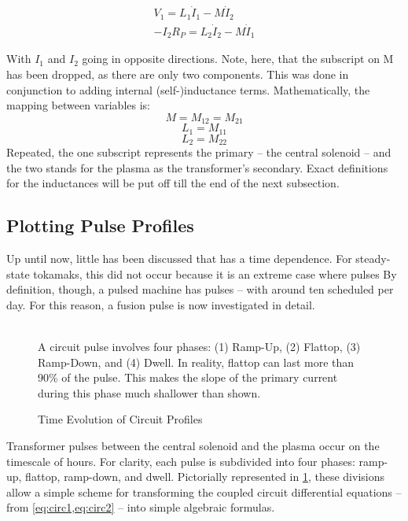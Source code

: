 \begin{align}
	\label{eq:circ1}
	V_1 = L_1 \dot I_1 - M \dot I_2 \\
	\label{eq:circ2}
	-I_2 R_P = L_2 \dot I_2 - M \dot I_1
\end{align}

With $I_1$ and $I_2$ going in opposite directions. Note, here, that the subscript on M has been dropped, as there are only two components. This was done in conjunction to adding internal (self-)inductance terms. Mathematically, the mapping between variables is:
\begin{equation}
	M = M_{12} = M_{21}
\end{equation}
\begin{equation}
	L_1 = M_{11}
\end{equation}
\begin{equation}
	L_2 = M_{22}
\end{equation}
Repeated, the one subscript represents the primary -- the central solenoid -- and the two stands for the plasma as the transformer's secondary. Exact definitions for the inductances will be put off till the end of the next subsection.

\subsection{Plotting Pulse Profiles}

Up until now, little has been discussed that has a time dependence. For steady-state tokamaks, this did not occur because it is an extreme case where pulses  By definition, though, a pulsed machine has pulses -- with around ten scheduled per day.\cite{ac_pulses} For this reason, a fusion pulse is now investigated in detail.

\begin{figure}[h!]
\centering

\caption{Time Evolution of Circuit Profiles}
\label{fig:circuit_profiles} ~\\
\small{A circuit pulse involves four phases: (1) Ramp-Up, (2) Flattop, (3) Ramp-Down, and (4) Dwell. In reality, flattop can last more than 90\% of the pulse.\cite{inputfile} This makes the slope of the primary current during this phase much shallower than shown. }
\end{figure}

Transformer pulses between the central solenoid and the plasma occur on the timescale of hours.  For clarity, each pulse is subdivided into four phases: ramp-up, flattop, ramp-down, and dwell. Pictorially represented in \cref{fig:circuit_profiles}, these divisions allow a simple scheme for transforming the coupled circuit differential equations -- from \cref{eq:circ1,eq:circ2} -- into simple algebraic formulas.

